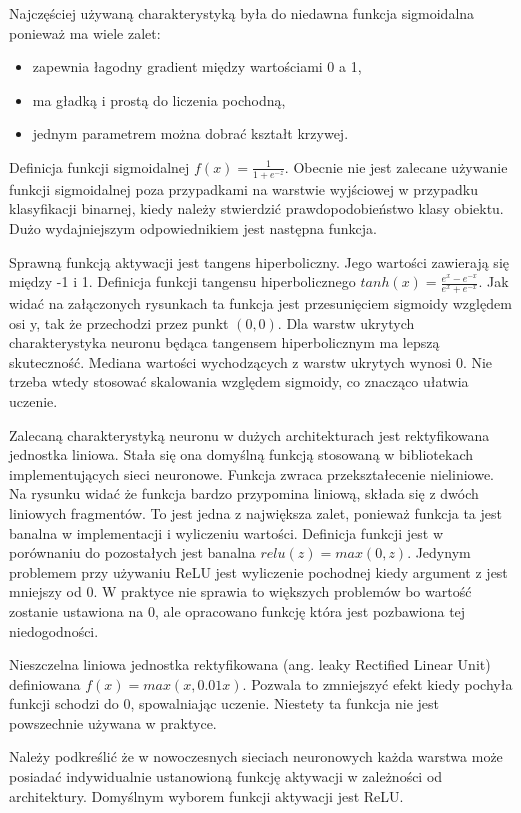 \documentclass[12pt,a4paper,twoside,titlepage,openright]{book}
\begin{document}
Najczęściej używaną charakterystyką była do niedawna funkcja sigmoidalna ponieważ ma wiele zalet:
\begin{itemize}
\item zapewnia łagodny gradient między wartościami 0 a 1,
\item ma gładką i prostą do liczenia pochodną,
\item jednym parametrem można dobrać kształt krzywej.
\end{itemize}
Definicja funkcji sigmoidalnej \(f(x) = \frac{1}{1+e^{-z}}\).
Obecnie nie jest zalecane używanie funkcji sigmoidalnej poza przypadkami na warstwie wyjściowej w przypadku klasyfikacji binarnej, kiedy należy stwierdzić prawdopodobieństwo klasy obiektu. Dużo wydajniejszym odpowiednikiem jest następna funkcja.

Sprawną funkcją aktywacji jest tangens hiperboliczny. Jego wartości zawierają się między -1 i 1. Definicja funkcji tangensu hiperbolicznego \(tanh(x) = \frac{e^{x} - e^{-x}}{e^{x} + e^{-x}}\). Jak widać na załączonych rysunkach ta funkcja jest przesunięciem sigmoidy względem osi y, tak że przechodzi przez punkt \((0,0)\). Dla warstw ukrytych charakterystyka neuronu będąca tangensem hiperbolicznym ma lepszą skuteczność. Mediana wartości wychodzących z warstw ukrytych wynosi 0. Nie trzeba wtedy stosować skalowania względem sigmoidy, co znacząco ułatwia uczenie.

Zalecaną charakterystyką neuronu w dużych architekturach jest rektyfikowana jednostka liniowa. Stała się ona domyślną funkcją stosowaną w bibliotekach implementujących sieci neuronowe. Funkcja zwraca przekształecenie nieliniowe. Na rysunku widać że funkcja bardzo przypomina liniową, składa się z dwóch liniowych fragmentów. To jest jedna z największa zalet, ponieważ funkcja ta jest banalna w implementacji i wyliczeniu wartości. Definicja funkcji jest w porównaniu do pozostałych jest banalna \(relu(z) = max(0,z)\). Jedynym problemem przy używaniu ReLU jest wyliczenie pochodnej kiedy argument z jest mniejszy od 0. W praktyce nie sprawia to większych problemów bo wartość zostanie ustawiona na 0, ale opracowano funkcję która jest pozbawiona tej niedogodności.

Nieszczelna liniowa jednostka rektyfikowana (ang. leaky Rectified Linear Unit) definiowana \(f(x) = max(x, 0.01x)\). Pozwala to zmniejszyć efekt kiedy pochyła funkcji schodzi do 0, spowalniając uczenie. Niestety ta funkcja nie jest powszechnie używana w praktyce.

Należy podkreślić że w nowoczesnych sieciach neuronowych każda warstwa może posiadać indywidualnie ustanowioną funkcję aktywacji w zależności od architektury. Domyślnym wyborem funkcji aktywacji jest ReLU. 
\end{document}
